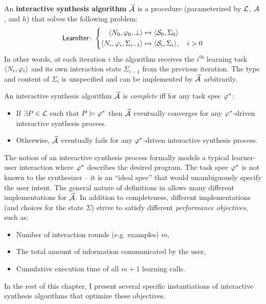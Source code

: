 \begin{problem}
    An \textbf{interactive synthesis algorithm} $\widehat{\mathcal{A}}$ is a procedure (parameterized by $\mathcal{L}$,
    $\mathcal{A}$, and $h$) that solves the following problem:
    \[
        \mathsf{LearnIter}\colon \left\{
        \begin{aligned}
            \langle N_0, \varphi_0, \bot\rangle &\mapsto \langle \mathcal{S}_0, \Sigma_0\rangle \\
            \langle N_i, \varphi_i, \Sigma_{i-1} \rangle &\mapsto \langle \mathcal{S}_i, \Sigma_i\rangle, \quad i > 0
        \end{aligned}
        \right.
    \]
    In other words, at each iteration $i$ the algorithm receives the $i^{\text{th}}$ learning task $\langle N_i,
    \varphi_i\rangle$ and its own interaction state $\Sigma_{i-1}$ from the previous iteration.
    The type and content of $\Sigma_i$ is unspecified and can be implemented by $\widehat{\mathcal{A}}$ arbitrarily.
    \label{problem:interactive}
\end{problem}

\begin{defn}
    An interactive synthesis algorithm $\widehat{\mathcal{A}}$ is \emph{complete} iff for any task spec $\varphi^{*}$:
    \begin{itemize}[nosep]
        \item If $\exists P \in \mathcal{L}$ such that $P \models \varphi^{*}$ then $\widehat{\mathcal{A}}$ eventually
            converges for any $\varphi^{*}$-driven interactive synthesis process.
        \item Otherwise, $\widehat{\mathcal{A}}$ eventually fails for any $\varphi^{*}$-driven interactive synthesis
            process.
    \end{itemize}
\end{defn}

The notion of an interactive synthesis process formally models a typical learner-user interaction where $\varphi^{*}$
describes the desired program.
The task spec $\varphi^{*}$ is not known to the synthesizer -- it is an ``ideal spec'' that would unambiguously specify
the user intent.
The general nature of definitions in  allows many different implementations for
$\widehat{\mathcal{A}}$.
In addition to completeness, different implementations (and choices for the state $\Sigma$) strive to satisfy different
\emph{performance objectives}, such as:
\begin{itemize}[nosep]
    \item Number of interaction rounds (e.g. examples) $m$,
    \item The total amount of information communicated by the user,
    \item Cumulative execution time of all $m+1$ learning calls.
\end{itemize}
In the rest of this chapter, I present several specific instantiations of interactive synthesis algorithms that optimize
these objectives.
